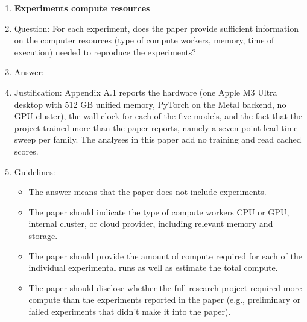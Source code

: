 \begin{enumerate}
\begin{itemize}
        \item For asymmetric distributions, the authors should be careful not to show in tables or figures symmetric error bars that would yield results that are out of range (e.g., negative error rates).
        \item If error bars are reported in tables or plots, the authors should explain in the text how they were calculated and reference the corresponding figures or tables in the text.
    \end{itemize}

\item {\bf Experiments compute resources}
    \item[] Question: For each experiment, does the paper provide sufficient information on the computer resources (type of compute workers, memory, time of execution) needed to reproduce the experiments?
    \item[] Answer: \answerYes{}
    \item[] Justification: Appendix A.1 reports the hardware (one Apple M3 Ultra desktop with 512 GB unified memory, PyTorch on the Metal backend, no GPU cluster), the wall clock for each of the five models, and the fact that the project trained more than the paper reports, namely a seven-point lead-time sweep per family. The analyses in this paper add no training and read cached scores.
    \item[] Guidelines:
    \begin{itemize}
        \item The answer \answerNA{} means that the paper does not include experiments.
        \item The paper should indicate the type of compute workers CPU or GPU, internal cluster, or cloud provider, including relevant memory and storage.
        \item The paper should provide the amount of compute required for each of the individual experimental runs as well as estimate the total compute. 
        \item The paper should disclose whether the full research project required more compute than the experiments reported in the paper (e.g., preliminary or failed experiments that didn't make it into the paper). 
    \end{itemize}
    

\end{enumerate}
